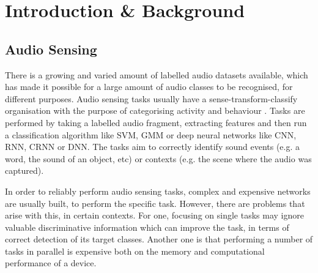 \chapter{Introduction \& Background}
	
	\section{Audio Sensing}
	
	There is a growing and varied amount of labelled audio datasets available, which has made it possible for a large amount of audio classes to be recognised, for different purposes. Audio sensing tasks usually have a sense-transform-classify organisation with the purpose of categorising activity and behaviour \cite{georgiev2017heterogeneous}. Tasks are performed by taking a labelled audio fragment, extracting features and then run a classification algorithm like SVM, GMM or deep neural networks like CNN, RNN, CRNN or DNN. The tasks aim to correctly identify sound events (e.g. a word, the sound of an object, etc) or contexts (e.g. the scene where the audio was captured). 
	
	In order to reliably perform audio sensing tasks, complex and expensive networks are usually built, to perform the specific task. However, there are problems that arise with this, in certain contexts. For one, focusing on single tasks may ignore valuable discriminative information which can improve the task, in terms of correct detection of its target classes. Another one is that performing a number of tasks in parallel is expensive both on the memory and computational performance of a device. 
	
	
	
